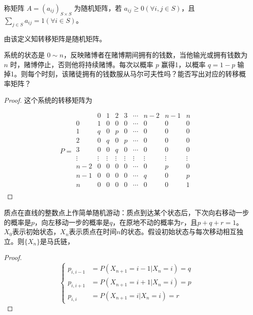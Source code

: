 \documentclass[lang=cn,10pt,thmcnt=section]{elegantbook}
\begin{document}
\begin{definition}[随机矩阵]
	称矩阵 $A = (a_{ij})_{S \times S}$ 为随机矩阵，若 $a_{ij} \geq 0 (\forall i, j \in S)$，且 $\sum_{j \in S} a_{ij} = 1 (\forall i \in S)$。
\end{definition}

由该定义知转移矩阵是随机矩阵。

\begin{example}[赌徒破产问题]
	系统的状态是 \(0 \sim n\)，反映赌博者在赌博期间拥有的钱数，当他输光或拥有钱数为 \(n\) 时，赌博停止，否则他将持续赌博。每次以概率 \(p\) 赢得1，以概率 \(q = 1 - p\) 输掉1。则每个时刻，该赌徒拥有的钱数服从马尔可夫性吗？能否写出对应的转移概率矩阵？
\end{example}
\begin{proof}
	这个系统的转移矩阵为

\[
P = 
\begin{array}{c|ccccccccc}
 & 0 & 1 & 2 & 3 & \cdots & n-2 & n-1 & n \\
\hline
0 & 1 & 0 & 0 & 0 & \cdots & 0 & 0 & 0 \\
1 & q & 0 & p & 0 & \cdots & 0 & 0 & 0 \\
2 & 0 & q & 0 & p & \cdots & 0 & 0 & 0 \\
3 & 0 & 0 & q & 0 & \cdots & 0 & 0 & 0 \\
\vdots & \vdots & \vdots & \vdots & \vdots & \vdots & \vdots & \vdots & \vdots \\
n-2 & 0 & 0 & 0 & 0 & \cdots & 0 & p & 0 \\
n-1 & 0 & 0 & 0 & 0 & \cdots & q & 0 & p \\
n & 0 & 0 & 0 & 0 & \cdots & 0 & 0 & 1 \\
\end{array}
\]
\end{proof}
\begin{example}[简单随机游动]
	质点在直线的整数点上作简单随机游动：质点到达某个状态后，下次向右移动一步的概率是$p$，向左移动一步的概率是$q$，在原地不动的概率为$r$，且$p + q + r = 1$。$X_0$表示初始状态，$X_n$表示质点在时间$n$的状态。假设初始状态与每次移动相互独立。则$\{X_n\}$是马氏链，
\end{example}
\begin{proof}
	\[
\left\{
\begin{aligned}
p_{i, i-1} &= P(X_{n+1} = i - 1 | X_n = i) = q \\
p_{i, i+1} &= P(X_{n+1} = i + 1 | X_n = i) = p \\
p_{i, i} &= P(X_{n+1} = i | X_n = i) = r
\end{aligned}
\right.
\]
\end{proof}
\end{document}
